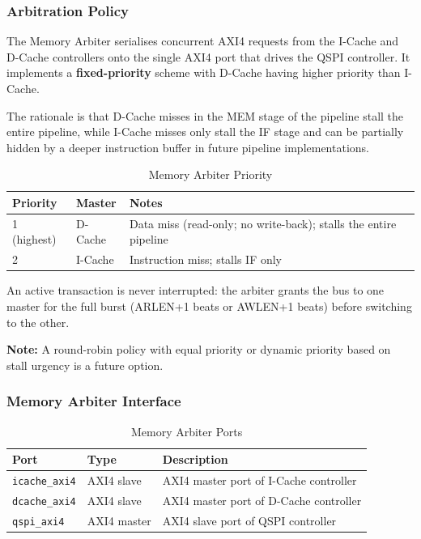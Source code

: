 \subsubsection{Arbitration Policy}

The Memory Arbiter serialises concurrent AXI4 requests from the I-Cache
and D-Cache controllers onto the single AXI4 port that drives the QSPI
controller.
It implements a \textbf{fixed-priority} scheme with D-Cache having higher
priority than I-Cache.

The rationale is that D-Cache misses in the MEM stage of the pipeline
stall the entire pipeline, while I-Cache misses only stall the IF stage
and can be partially hidden by a deeper instruction buffer in future
pipeline implementations.

\begin{table}[H]
\caption{Memory Arbiter Priority}
\label{tab:asArbPriority}
\centering
\begin{tabularx}{\textwidth}{|l |l |X|}
  \hline
  Priority & Master & Notes \\
  \hline
  \hline
  1 (highest) & D-Cache & Data miss (read-only; no write-back); stalls the entire pipeline \\
  \hline
  2           & I-Cache & Instruction miss; stalls IF only \\
  \hline
\end{tabularx}
\end{table}

An active transaction is never interrupted: the arbiter grants the bus to
one master for the full burst (ARLEN+1 beats or AWLEN+1 beats) before
switching to the other.

\textbf{Note:} A round-robin policy with equal priority or dynamic priority
based on stall urgency is a future option.

\subsubsection{Memory Arbiter Interface}

\begin{table}[H]
\caption{Memory Arbiter Ports}
\label{tab:asArbPorts}
\centering
\begin{tabularx}{\textwidth}{|l |l |X|}
  \hline
  Port & Type & Description \\
  \hline
  \hline
  \texttt{icache\_axi4} & AXI4 slave  & AXI4 master port of I-Cache controller \\
  \hline
  \texttt{dcache\_axi4} & AXI4 slave  & AXI4 master port of D-Cache controller \\
  \hline
  \texttt{qspi\_axi4}   & AXI4 master & AXI4 slave port of QSPI controller \\
  \hline
\end{tabularx}
\end{table}

